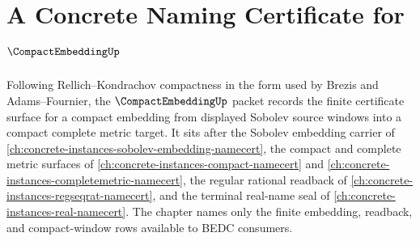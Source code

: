\chapter{A Concrete Naming Certificate for $\CompactEmbeddingUp$}
\label{ch:concrete-instances-compact-embedding-namecert}

Following Rellich--Kondrachov compactness in the form used by Brezis and Adams--Fournier, the $\CompactEmbeddingUp$ packet records the finite certificate surface for a compact embedding from displayed Sobolev source windows into a compact complete metric target. It sits after the Sobolev embedding carrier of \autoref{ch:concrete-instances-sobolev-embedding-namecert}, the compact and complete metric surfaces of \autoref{ch:concrete-instances-compact-namecert} and \autoref{ch:concrete-instances-completemetric-namecert}, the regular rational readback of \autoref{ch:concrete-instances-regseqrat-namecert}, and the terminal real-name seal of \autoref{ch:concrete-instances-real-namecert}. The chapter names only the finite embedding, readback, and compact-window rows available to BEDC consumers.

